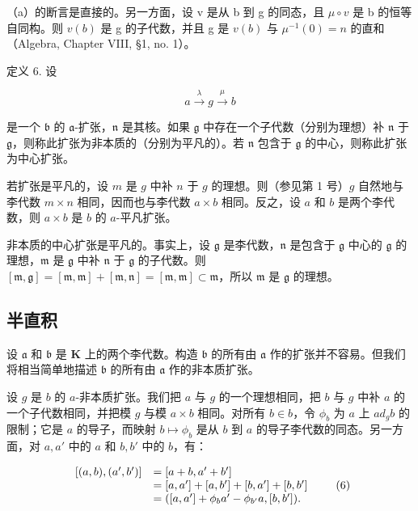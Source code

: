 （a）的断言是直接的。另一方面，设 v 是从 b 到 g 的同态，且 \(\mu \circ v\) 是 b 的恒等自同构。则 \(v(b)\) 是 g 的子代数，并且 g 是 \(v(b)\) 与 \(\mu^{-1}(0) = n\) 的直和（Algebra, Chapter VIII, §1, no. 1）。

定义 6. 设

\[
a \xrightarrow {\lambda} g \xrightarrow {\mu} b
\]

是一个 \(\mathfrak{b}\) 的 \(\mathfrak{a}\)-扩张，\(\mathfrak{n}\) 是其核。如果 \(\mathfrak{g}\) 中存在一个子代数（分别为理想）补 \(\mathfrak{n}\) 于 \(\mathfrak{g}\)，则称此扩张为非本质的（分别为平凡的）。若 \(\mathfrak{n}\) 包含于 \(\mathfrak{g}\) 的中心，则称此扩张为中心扩张。

若扩张是平凡的，设 \(m\) 是 \(g\) 中补 \(n\) 于 \(g\) 的理想。则（参见第 1 号）\(g\) 自然地与李代数 \(m \times n\) 相同，因而也与李代数 \(a \times b\) 相同。反之，设 \(a\) 和 \(b\) 是两个李代数，则 \(a \times b\) 是 \(b\) 的 \(a\)-平凡扩张。

非本质的中心扩张是平凡的。事实上，设 \(\mathfrak{g}\) 是李代数，\(\mathfrak{n}\) 是包含于 \(\mathfrak{g}\) 中心的 \(\mathfrak{g}\) 的理想，\(\mathfrak{m}\) 是 \(\mathfrak{g}\) 中补 \(\mathfrak{n}\) 于 \(\mathfrak{g}\) 的子代数。则 \([\mathfrak{m},\mathfrak{g}] = [\mathfrak{m},\mathfrak{m}] + [\mathfrak{m},\mathfrak{n}] = [\mathfrak{m},\mathfrak{m}] \subset \mathfrak{m}\)，所以 \(\mathfrak{m}\) 是 \(\mathfrak{g}\) 的理想。

\subsection{半直积}

设 \(\mathfrak{a}\) 和 \(\mathfrak{b}\) 是 \(\mathbf{K}\) 上的两个李代数。构造 \(\mathfrak{b}\) 的所有由 \(\mathfrak{a}\) 作的扩张并不容易。但我们将相当简单地描述 \(\mathfrak{b}\) 的所有由 \(\mathfrak{a}\) 作的非本质扩张。

设 \(g\) 是 \(b\) 的 \(a\)-非本质扩张。我们把 \(a\) 与 \(g\) 的一个理想相同，把 \(b\) 与 \(g\) 中补 \(a\) 的一个子代数相同，并把模 \(g\) 与模 \(a \times b\) 相同。对所有 \(b \in b\)，令 \(\phi_b\) 为 \(a\) 上 \(ad_g b\) 的限制；它是 \(a\) 的导子，而映射 \(b \mapsto \phi_b\) 是从 \(b\) 到 \(a\) 的导子李代数的同态。另一方面，对 \(a, a'\) 中的 \(a\) 和 \(b, b'\) 中的 \(b\)，有：

\[
\begin{array}{r l} {[ (a, b), (a ^ {\prime}, b ^ {\prime}) ]} & {= [ a + b, a ^ {\prime} + b ^ {\prime} ]} \\ & {= [ a, a ^ {\prime} ] + [ a, b ^ {\prime} ] + [ b, a ^ {\prime} ] + [ b, b ^ {\prime} ]} \\ & {= ([ a, a ^ {\prime} ] + \phi_ {b} a ^ {\prime} - \phi_ {b ^ {\prime}} a, [ b, b ^ {\prime} ]).} \end{array}\tag{6}
\]

